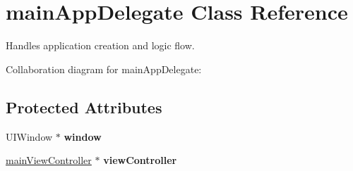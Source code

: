 \hypertarget{interfacemain_app_delegate}{
\section{mainAppDelegate Class Reference}
\label{interfacemain_app_delegate}
}


Handles application creation and logic flow.  




Collaboration diagram for mainAppDelegate:
\subsection*{Protected Attributes}
\begin{DoxyCompactItemize}
\item 
\hypertarget{interfacemain_app_delegate_a9cfdd8d5a58a043a811ac5af34db51af}{
UIWindow $\ast$ {\bfseries window}}
\label{interfacemain_app_delegate_a9cfdd8d5a58a043a811ac5af34db51af}

\item 
\hypertarget{interfacemain_app_delegate_a53f3ad25ed5c526f2402fa8cbc0b5923}{
\hyperlink{interfacemain_view_controller}{mainViewController} $\ast$ {\bfseries viewController}}
\label{interfacemain_app_delegate_a53f3ad25ed5c526f2402fa8cbc0b5923}

\end{DoxyCompactItemize}
